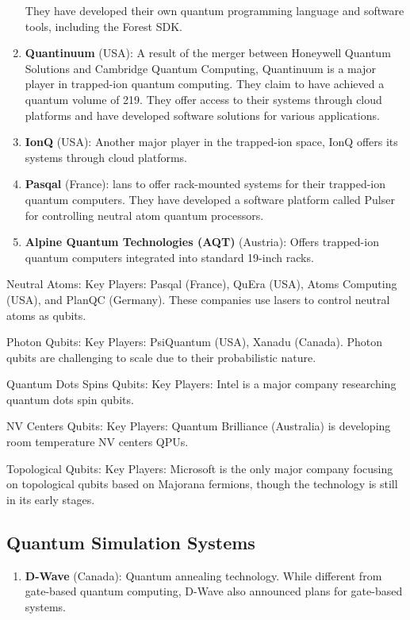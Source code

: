 \begin{enumerate}
 They have developed their own quantum programming language and software tools, including the Forest SDK.
\item \textbf{Quantinuum} (USA): A result of the merger between Honeywell Quantum Solutions and Cambridge Quantum Computing,
  Quantinuum is a major player in trapped-ion quantum computing.
 They claim to have achieved a quantum volume of 219.
 They offer access to their systems through cloud platforms and have developed software solutions for various applications.
\item \textbf{IonQ} (USA): Another major player in the trapped-ion space, IonQ offers its systems through cloud platforms.
\item \textbf{Pasqal} (France): lans to offer rack-mounted systems for their trapped-ion quantum computers.
 They have developed a software platform called Pulser for controlling neutral atom quantum processors.
\item \textbf{Alpine Quantum Technologies (AQT)} (Austria): Offers trapped-ion quantum computers integrated into
  standard 19-inch racks.
\end{enumerate}

Neutral Atoms:  Key Players: Pasqal (France), QuEra (USA), Atoms Computing (USA), and PlanQC (Germany).
 These companies use lasers to control neutral atoms as qubits.

Photon Qubits: Key Players: PsiQuantum (USA), Xanadu (Canada).
 Photon qubits are challenging to scale due to their probabilistic nature.

Quantum Dots Spins Qubits: Key Players: Intel is a major company researching quantum dots spin qubits.

NV Centers Qubits: Key Players: Quantum Brilliance (Australia) is developing room temperature NV centers QPUs.

Topological Qubits: Key Players: Microsoft is the only major company focusing on topological qubits based on Majorana fermions, though the technology is still in its early stages.


\subsection{Quantum Simulation Systems}

\begin{enumerate}
\item \textbf{D-Wave} (Canada): Quantum annealing technology.  While different from gate-based quantum computing,
  D-Wave also announced plans for gate-based systems.
\end{enumerate}


